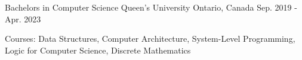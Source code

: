 

\begin{cventries}

  \cventry
    {Bachelors in Computer Science} %
    {Queen's University} %
    {Ontario, Canada} %
    {Sep. 2019 - Apr. 2023} %
    {
      \begin{cvitems} %
        \item {Courses: Data Structures, Computer Architecture, System-Level Programming, Logic for Computer Science, Discrete Mathematics}
      \end{cvitems}
    }

\end{cventries}
